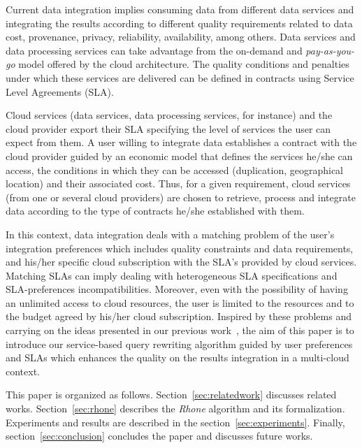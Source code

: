 Current data integration implies consuming data from different data services and
integrating the results according to different quality requirements related to
data cost, provenance, privacy, reliability, availability, among others. Data
services and data processing services can take advantage from the on-demand and
\textit{pay-as-you-go} model offered by the cloud architecture. The quality
conditions and penalties under which these services are delivered can be defined in
contracts using Service Level Agreements (SLA).        

Cloud services (data services, data processing services, for instance) and the
cloud provider export their SLA specifying the level of services the user can
expect from them. A user willing to integrate data establishes a contract with
the cloud provider guided by an economic model that defines the services he/she can
access, the conditions in which they can be accessed (duplication, geographical
location) and their associated cost. Thus, for a given requirement, cloud services 
(from one or several cloud providers) are chosen to 
retrieve, process and integrate data according to the type of contracts
he/she established with them.         

In this context, data integration deals with a matching problem of the user's
integration preferences which includes quality constraints and data
requirements, and his/her specific cloud subscription with the SLA's provided by
cloud services. Matching SLAs can imply dealing with heterogeneous SLA
specifications and SLA-preferences incompatibilities. Moreover, even with
the possibility of having an unlimited access to cloud resources, the user is
limited to the resources and to the budget agreed by his/her cloud subscription. 
Inspired by these problems and carrying on the ideas presented in our previous work~\cite{Bennani2014},
the aim of this paper is to introduce our service-based query rewriting algorithm guided by user 
preferences and SLAs which enhances the quality on the results integration in a multi-cloud context. 
          
This paper is organized as follows. 
Section~\ref{sec:relatedwork} discusses related works. 
Section~\ref{sec:rhone} describes the \textit{Rhone} algorithm and its formalization. Experiments and results are described in the section~\ref{sec:experiments}. 
Finally, section~\ref{sec:conclusion} concludes the paper and discusses future works.